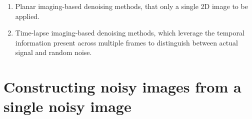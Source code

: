 \begin{enumerate}
  
\item Planar imaging-based denoising methods, that only a single 2D image to be applied.



\item Time-lapse imaging-based denoising methods, which leverage the
  temporal information present across multiple frames to distinguish
  between actual signal and random noise.
  


\end{enumerate}

\section{Constructing noisy images from a single noisy image}

